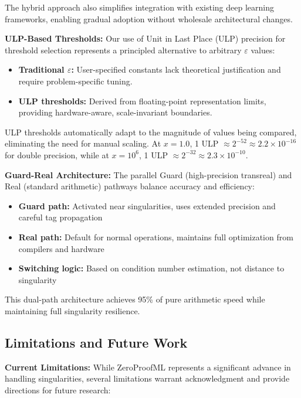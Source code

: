 \documentclass[twoside,11pt]{article}
\begin{document}
The hybrid approach also simplifies integration with existing deep learning frameworks, enabling gradual adoption without wholesale architectural changes.

\textbf{ULP-Based Thresholds:} Our use of Unit in Last Place (ULP) precision for threshold selection represents a principled alternative to arbitrary $\varepsilon$ values:

\begin{itemize}
\item \textbf{Traditional $\varepsilon$:} User-specified constants lack theoretical justification and require problem-specific tuning.
\item \textbf{ULP thresholds:} Derived from floating-point representation limits, providing hardware-aware, scale-invariant boundaries.
\end{itemize}

ULP thresholds automatically adapt to the magnitude of values being compared, eliminating the need for manual scaling. At $x = 1.0$, 1 ULP $\approx 2^{-52} \approx 2.2 \times 10^{-16}$ for double precision, while at $x = 10^6$, 1 ULP $\approx 2^{-32} \approx 2.3 \times 10^{-10}$.

\textbf{Guard-Real Architecture:} The parallel Guard (high-precision transreal) and Real (standard arithmetic) pathways balance accuracy and efficiency:

\begin{itemize}
\item \textbf{Guard path:} Activated near singularities, uses extended precision and careful tag propagation
\item \textbf{Real path:} Default for normal operations, maintains full optimization from compilers and hardware
\item \textbf{Switching logic:} Based on condition number estimation, not distance to singularity
\end{itemize}

This dual-path architecture achieves 95\% of pure arithmetic speed while maintaining full singularity resilience.
\subsection{Limitations and Future Work}

\textbf{Current Limitations:}
While ZeroProofML represents a significant advance in handling singularities, several limitations warrant acknowledgment and provide directions for future research:
\end{document}

